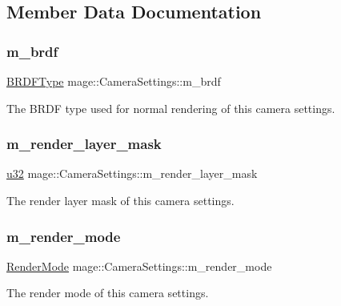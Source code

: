 \subsection{Member Data Documentation}
\hypertarget{structmage_1_1_camera_settings_ac6a51ea7c770af79de4f97b53cab83b7}{}\label{structmage_1_1_camera_settings_ac6a51ea7c770af79de4f97b53cab83b7} 
\subsubsection{\texorpdfstring{m\+\_\+brdf}{m\_brdf}}
{\footnotesize\ttfamily \hyperlink{namespacemage_ae7a7a03a7b34d7e2689689bb8295cd38}{B\+R\+D\+F\+Type} mage\+::\+Camera\+Settings\+::m\+\_\+brdf\hspace{0.3cm}{\ttfamily [private]}}

The B\+R\+DF type used for normal rendering of this camera settings. \hypertarget{structmage_1_1_camera_settings_ae5551fd81b3b9e0c61a3ba8b3fb40896}{}\label{structmage_1_1_camera_settings_ae5551fd81b3b9e0c61a3ba8b3fb40896} 
\subsubsection{\texorpdfstring{m\+\_\+render\+\_\+layer\+\_\+mask}{m\_render\_layer\_mask}}
{\footnotesize\ttfamily \hyperlink{namespacemage_af2b398bf98eb10351f49cad73fe2cc73}{u32} mage\+::\+Camera\+Settings\+::m\+\_\+render\+\_\+layer\+\_\+mask\hspace{0.3cm}{\ttfamily [private]}}

The render layer mask of this camera settings. \hypertarget{structmage_1_1_camera_settings_aa4d5139b4e8668c58507ead30812c84b}{}\label{structmage_1_1_camera_settings_aa4d5139b4e8668c58507ead30812c84b} 
\subsubsection{\texorpdfstring{m\+\_\+render\+\_\+mode}{m\_render\_mode}}
{\footnotesize\ttfamily \hyperlink{namespacemage_a5e7e18b0154373ce8fc942fe3f6b27fd}{Render\+Mode} mage\+::\+Camera\+Settings\+::m\+\_\+render\+\_\+mode\hspace{0.3cm}{\ttfamily [private]}}

The render mode of this camera settings. 